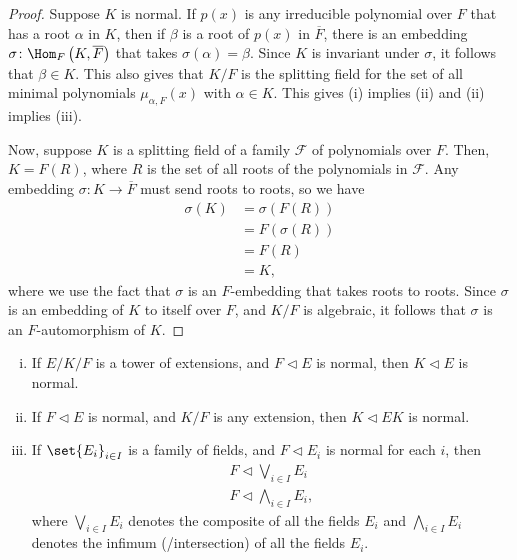 \documentclass[10pt]{mypackage}
\begin{document}
\begin{proof}
  Suppose $K$ is normal. If $p(x)$ is any irreducible polynomial over $F$ that has a root $\alpha$ in $K$, then if $\beta$ is a root of $p(x)$ in $ \overline{F} $, there is an embedding $\sigma\colon \Hom_F\left(K, \overline{F}\right)$ that takes $\sigma(\alpha) = \beta$. Since $K$ is invariant under $\sigma$, it follows that $\beta\in K$. This also gives that $K/F$ is the splitting field for the set of all minimal polynomials $\mu_{\alpha,F}(x)$ with $\alpha\in K$. This gives (i) implies (ii) and (ii) implies (iii).

  Now, suppose $K$ is a splitting field of a family $ \mathcal{F} $ of polynomials over $F$. Then, $K = F\left( R \right)$, where $R$ is the set of all roots of the polynomials in $ \mathcal{F} $. Any embedding $\sigma\colon K\rightarrow \overline{F}$ must send roots to roots, so we have
  \begin{align*}
    \sigma\left( K \right) &= \sigma\left( F\left( R \right) \right)\\
                           &= F\left( \sigma(R) \right)\\
                           &= F\left( R \right)\\
                           &= K,
  \end{align*}
  where we use the fact that $\sigma$ is an $F$-embedding that takes roots to roots. Since $\sigma$ is an embedding of $K$ to itself over $F$, and $K/F$ is algebraic, it follows that $\sigma$ is an $F$-automorphism of $K$.
\end{proof}
\begin{theorem}\hfill
  \begin{enumerate}[(i)]
    \item If $E/K/F$ is a tower of extensions, and $F\triangleleft E$ is normal, then $K\triangleleft E$ is normal.
    \item If $F\triangleleft E$ is normal, and $K/F$ is any extension, then $K\triangleleft EK$ is normal.
    \item If $\set{E_i}_{i\in I}$ is a family of fields, and $F\triangleleft E_i$ is normal for each $i$, then
      \begin{align*}
        F\triangleleft \bigvee_{i\in I}E_i\\
        F \triangleleft \bigwedge_{i\in I}E_i,
      \end{align*}
      where $\bigvee_{i\in I}E_i$ denotes the composite of all the fields $E_i$ and $\bigwedge_{i\in I}E_i$ denotes the infimum (/intersection) of all the fields $E_i$.
  \end{enumerate}
\end{theorem}
\end{document}
